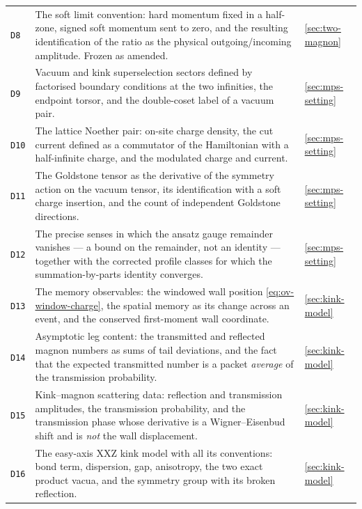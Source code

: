 {\begin{longtable}{@{}p{}p{}p{}@{}}
\texttt{D8} & The soft limit convention: hard momentum fixed in a half-zone,
signed soft momentum sent to zero, and the resulting identification of the
ratio as the physical outgoing/incoming amplitude. Frozen as amended. & \cref{sec:two-magnon}\\

\texttt{D9} & Vacuum and kink superselection sectors defined by factorised
boundary conditions at the two infinities, the endpoint torsor, and the
double-coset label of a vacuum pair. & \cref{sec:mps-setting}\\

\texttt{D10} & The lattice Noether pair: on-site charge density, the cut
current defined as a commutator of the Hamiltonian with a half-infinite
charge, and the modulated charge and current. & \cref{sec:mps-setting}\\

\texttt{D11} & The Goldstone tensor as the derivative of the symmetry action
on the vacuum tensor, its identification with a soft charge insertion, and the
count of independent Goldstone directions. & \cref{sec:mps-setting}\\

\texttt{D12} & The precise senses in which the ansatz gauge remainder vanishes
--- a bound on the remainder, not an identity --- together with the corrected
profile classes for which the summation-by-parts identity converges. & \cref{sec:mps-setting}\\

\texttt{D13} & The memory observables: the windowed wall position
\eqref{eq:ov-window-charge}, the spatial memory as its change across an event,
and the conserved first-moment wall coordinate. & \cref{sec:kink-model}\\

\texttt{D14} & Asymptotic leg content: the transmitted and reflected magnon
numbers as sums of tail deviations, and the fact that the expected transmitted
number is a packet \emph{average} of the transmission probability. & \cref{sec:kink-model}\\

\texttt{D15} & Kink--magnon scattering data: reflection and transmission
amplitudes, the transmission probability, and the transmission phase whose
derivative is a Wigner--Eisenbud shift and is \emph{not} the wall
displacement. & \cref{sec:kink-model}\\

\texttt{D16} & The easy-axis XXZ kink model with all its conventions: bond
term, dispersion, gap, anisotropy, the two exact product vacua, and the
symmetry group with its broken reflection. & \cref{sec:kink-model}\\


\end{longtable}}
